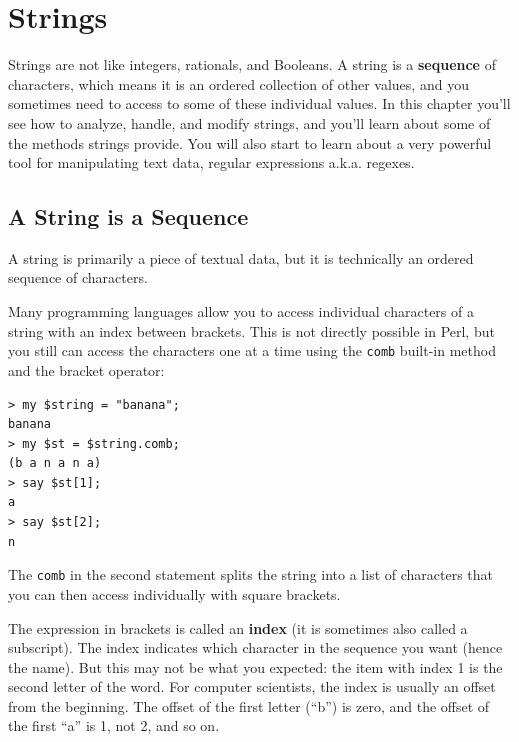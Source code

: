 
\chapter{Strings}
\label{strings}

Strings are not like integers, rationals, and Booleans.  
A string is a {\bf sequence} of characters, which means 
it is an ordered collection of other values, and you 
sometimes need to access to some of these individual 
values.  In this chapter you'll see how to analyze, 
handle, and modify strings, and you'll learn about some 
of the methods strings provide. You will also start to learn about 
a very powerful tool for manipulating text data, regular 
expressions a.k.a. regexes.


\section{A String is a Sequence}

A string is primarily a piece of textual data, but it 
is technically an ordered sequence of characters.  

Many programming languages allow you to access individual 
characters of a string with an index between brackets. This 
is not directly possible in Perl, but you still can access 
the characters one at a time using the {\tt comb} built-in 
method and the bracket operator:

\begin{verbatim}
> my $string = "banana";
banana
> my $st = $string.comb;
(b a n a n a)
> say $st[1];
a
> say $st[2];
n
\end{verbatim}
%
The {\tt comb} in the second statement splits the string 
into a list of characters that you can then access 
individually with square brackets.

The expression in brackets is called an {\bf index} 
(it is sometimes also called a subscript).  
The index indicates which character in the sequence you
want (hence the name). But this may not be what you 
expected: the item with index 1 is the second letter of 
the word. For computer scientists, the index is usually 
an offset from the beginning. The offset of the first 
letter (``b'') is zero, and the 
offset of the first ``a'' is 1, not 2, and so on.


